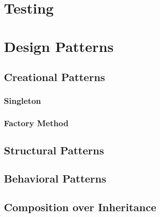 \documentclass[oneside,11pt,dvipsnames]{book}
\begin{document}




\chapter{Testing}

\chapter{Design Patterns}

\section{Creational Patterns}
\subsection{Singleton}
\subsection{Factory Method}

\section{Structural Patterns}
\section{Behavioral Patterns}



\section{Composition over Inheritance}


\appendix
\end{document}
